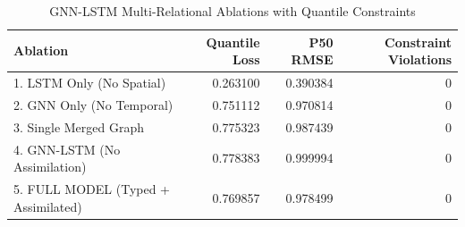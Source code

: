 \begin{table}
\caption{GNN-LSTM Multi-Relational Ablations with Quantile Constraints}
\begin{tabular}{lrrr}
\toprule
Ablation & Quantile Loss & P50 RMSE & Constraint Violations \\
\midrule
1. LSTM Only (No Spatial) & 0.263100 & 0.390384 & 0 \\
2. GNN Only (No Temporal) & 0.751112 & 0.970814 & 0 \\
3. Single Merged Graph & 0.775323 & 0.987439 & 0 \\
4. GNN-LSTM (No Assimilation) & 0.778383 & 0.999994 & 0 \\
5. FULL MODEL (Typed + Assimilated) & 0.769857 & 0.978499 & 0 \\
\bottomrule
\end{tabular}
\end{table}
